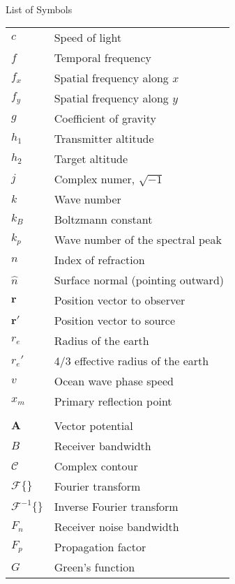 \renewcommand{\baselinestretch}{1}
\small\normalsize
\hbox{\ }

\vspace{-4em}

\begin{center}
\large{List of Symbols}
\end{center} 

\vspace{3pt}

\begin{supertabular}{ll}
$c$ & Speed of light \\
$f$ & Temporal frequency \\
$f_x$ & Spatial frequency along $x$ \\
$f_y$ & Spatial frequency along $y$ \\
$g$ & Coefficient of gravity \\
$h_1$ & Transmitter altitude\\
$h_2$ & Target altitude \\
$j$ & Complex numer, $\sqrt{-1}$ \\
$k$ & Wave number \\
$k_B$ & Boltzmann constant \\
$k_p$ & Wave number of the spectral peak \\
$n$ & Index of refraction \\
$\hat{n}$ & Surface normal (pointing outward) \\
$\mathbf{r}$ & Position vector to observer \\
$\mathbf{r}'$ & Position vector to source \\
$r_e$ & Radius of the earth \\
$r_e'$ & 4/3 effective radius of the earth \\
$v$ & Ocean wave phase speed \\
$x_m$ & Primary reflection point \\
\\
$\mathbf{A}$ & Vector potential \\
$B$ & Receiver bandwidth \\
$\mathcal{C}$ & Complex contour \\
$\mathcal{F}\{\}$ & Fourier transform \\
$\mathcal{F}^{-1}\{\}$ & Inverse Fourier transform \\
$F_n$ & Receiver noise bandwidth \\
$F_p$ & Propagation factor \\
$G$ & Green's function \\

\end{supertabular}

